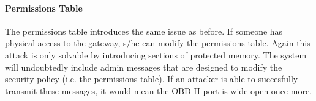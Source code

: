 \paragraph{Permissions Table} The permissions table introduces the same issue as before. If someone has physical access to the gateway, s/he can modify the permissions table. Again this attack is only solvable by introducing sections of protected memory. The system will undoubtedly include admin messages that are designed to modify the security policy (i.e. the permissions table). If an attacker is able to succesfully transmit these messages, it would mean the OBD-II port is wide open once more.
